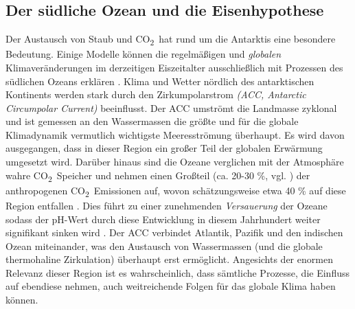 \documentclass[12pt,a4paper,onecolumn]{scrartcl}
\newcommand{\cotwo}{CO\textsubscript{2}}
\begin{document}
\subsection{Der südliche Ozean und die Eisenhypothese} \label{sec:Eisenhypothese}
Der Austausch von Staub und \cotwo \ hat rund um die Antarktis eine besondere Bedeutung. Einige Modelle können die regelmäßigen und \textit{globalen} Klimaveränderungen im derzeitigen Eiszeitalter  ausschließlich mit Prozessen des südlichen Ozeans erklären \citep{Fischer.2010}. Klima und Wetter nördlich des antarktischen Kontinents werden stark durch den  Zirkumpolarstrom \textit{(ACC, Antarctic Circumpolar Current)} beeinflusst. Der ACC umströmt die Landmasse zyklonal und ist gemessen an den Wassermassen die größte und für die globale Klimadynamik vermutlich wichtigste Meeresströmung überhaupt. Es wird davon ausgegangen, dass in dieser Region ein großer Teil der globalen Erwärmung umgesetzt wird. Darüber hinaus sind die Ozeane verglichen mit der Atmosphäre wahre \cotwo \ Speicher und nehmen einen Großteil (ca. 20-30 \%, vgl. \citep{IPCCpol.2019}) der anthropogenen \cotwo \ Emissionen auf, wovon schätzungsweise etwa 40 \% auf diese Region entfallen \citep{Boning.2008}. Dies führt zu einer zunehmenden \textit{Versauerung} der Ozeane sodass der pH-Wert durch diese Entwicklung in diesem Jahrhundert weiter signifikant sinken wird \citep{IPCCpol.2019}. Der ACC verbindet Atlantik, Pazifik und den indischen Ozean miteinander, was den Austausch von Wassermassen (und die globale thermohaline Zirkulation) überhaupt erst ermöglicht. Angesichts der enormen Relevanz dieser Region ist es wahrscheinlich, dass sämtliche Prozesse, die Einfluss auf ebendiese nehmen, auch weitreichende Folgen für das globale Klima haben können. \\
\end{document}
